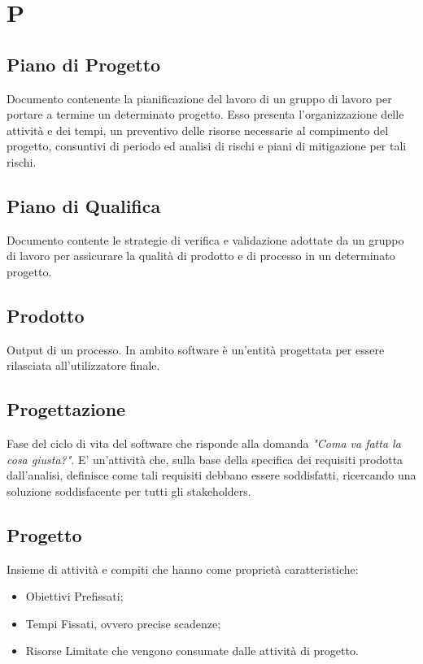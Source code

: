 \section*{P}

\subsection{Piano di Progetto}
Documento contenente la pianificazione del lavoro di un gruppo di lavoro per portare a termine un determinato progetto. Esso presenta l'organizzazione delle attività e dei tempi, un preventivo delle risorse necessarie al compimento del progetto, consuntivi di periodo ed analisi di rischi e piani di mitigazione per tali rischi.

\subsection{Piano di Qualifica}
Documento contente le strategie di verifica e validazione adottate da un gruppo di lavoro per assicurare la qualità di prodotto e di processo in un determinato progetto.

\subsection{Prodotto}
Output di un processo. In ambito software è un'entità progettata per essere rilasciata all'utilizzatore finale.

\subsection{Progettazione}
Fase del ciclo di vita del software che risponde alla domanda \textit{"Coma va fatta la cosa giusta?"}. E' un'attività che, sulla base della specifica dei requisiti prodotta dall'analisi, definisce come tali requisiti debbano essere soddisfatti, ricercando una soluzione soddisfacente per tutti gli stakeholders.

\subsection{Progetto}
Insieme di attività e compiti che hanno come proprietà caratteristiche:
\begin{itemize}
	\item Obiettivi Prefissati;
	\item Tempi Fissati, ovvero precise scadenze;
	\item Risorse Limitate che vengono consumate dalle attività di progetto.
\end{itemize}